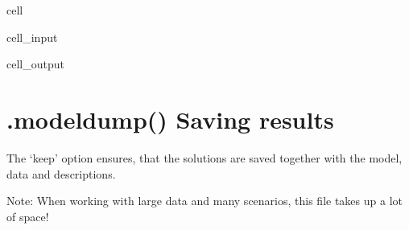 \documentclass[letterpaper,10pt,english]{jupyterBook}
\begin{document}
\begin{sphinxuseclass}{cell}\begin{sphinxVerbatimInput}

\begin{sphinxuseclass}{cell_input}
\begin{sphinxVerbatim}[commandchars=\\\{\}]
   
\end{sphinxVerbatim}

\end{sphinxuseclass}\end{sphinxVerbatimInput}
\begin{sphinxVerbatimOutput}

\begin{sphinxuseclass}{cell_output}
\noindent{}

\noindent{}

\end{sphinxuseclass}\end{sphinxVerbatimOutput}

\end{sphinxuseclass}

\section{.modeldump() Saving results}
\label{\detokenize{content/howto/experiments/create_save_scenarios:modeldump-saving-results}}
\sphinxAtStartPar
The ‘keep’ option ensures, that the solutions are saved together with the model, data and descriptions.

\sphinxAtStartPar
Note: When working with large data and many scenarios, this file takes up a lot of space!
\end{document}

